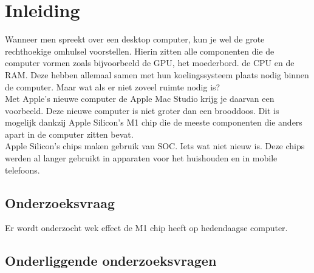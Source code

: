 \documentclass{hogent-article}
\affiliation{
    \textsuperscript{1} \href{mailto:jona.deneve.@student.hogent.be}{jona.deneve.@student.hogent.be}
}
\begin{document}
\flushbottom %
\maketitle %
    \tableofcontents %
\thispagestyle{empty} %


\section{Inleiding}


Wanneer men spreekt over een desktop computer, kun je wel de grote rechthoekige omhulsel voorstellen. Hierin zitten alle componenten die de computer vormen zoals bijvoorbeeld de GPU, het moederbord. de CPU en de RAM. Deze hebben allemaal samen met hun koelingssysteem plaats nodig binnen de computer. Maar wat als er niet zoveel ruimte nodig is? \\
Met Apple's nieuwe computer de Apple Mac Studio krijg je daarvan een voorbeeld. Deze nieuwe computer is niet groter dan een brooddoos. Dit is mogelijk dankzij Apple Silicon's M1 chip die de meeste componenten die anders apart in de computer zitten bevat. \\
Apple Silicon's chips maken gebruik van SOC. Iets wat niet nieuw is. Deze chips werden al langer gebruikt in apparaten voor het huishouden en in mobile telefoons.

\subsection{Onderzoeksvraag}

Er wordt onderzocht wek effect de M1 chip heeft op hedendaagse computer.

\subsection{Onderliggende onderzoeksvragen}
\end{document}
